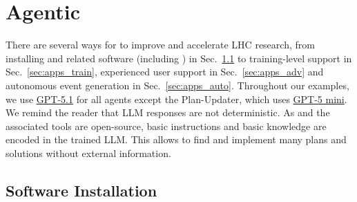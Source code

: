 \documentclass[submission, Phys]{SciPost}
\begin{document}
\section{Agentic \mg}
\label{sec:apps}

There are several ways for \ma to improve and accelerate LHC research, from installing \mg and related software (including \root) in Sec.~\ref{sec:apps_install} to training-level support in Sec.~\ref{sec:apps_train}, experienced user support in Sec.~\ref{sec:apps_adv} and autonomous event generation in Sec.~\ref{sec:apps_auto}. Throughout our examples, we use \href{https://platform.openai.com/docs/models/gpt-5.1}{GPT-5.1} for all agents except the Plan-Updater, which uses \href{https://platform.openai.com/docs/models/gpt-5-mini}{GPT-5 mini}. We remind the reader that LLM responses are not deterministic. As \mg and the associated tools are open-source, basic instructions and basic knowledge are encoded in the trained LLM. This allows \ma to find and implement many plans and solutions without external information.

\subsection{Software Installation}
\label{sec:apps_install}
\end{document}
